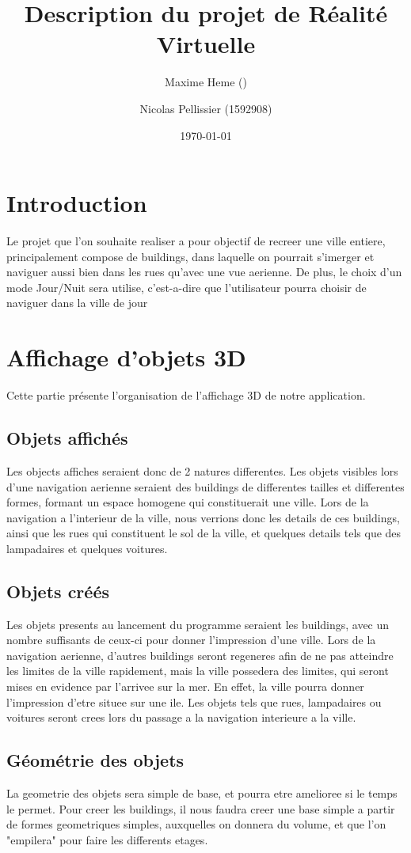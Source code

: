 \documentclass[a4paper,12pt]{article}
\title{Description du projet de Réalité Virtuelle}
\date{\today}
\author{Maxime Heme ()  \and Nicolas Pellissier (1592908)}
\begin{document}
\maketitle
\section*{Introduction}
Le projet que l'on souhaite realiser a pour objectif de recreer une ville entiere, principalement compose de buildings, dans laquelle on pourrait s'imerger et naviguer aussi bien dans les rues qu'avec une vue aerienne.
De plus, le choix d'un mode Jour/Nuit sera  utilise, c'est-a-dire que l'utilisateur pourra choisir de naviguer dans la ville de jour

\section {Affichage d'objets 3D}

Cette partie présente l'organisation de l'affichage 3D de notre application.
\subsection{Objets affichés}
Les objects affiches seraient donc de 2 natures differentes. Les objets visibles lors d'une navigation aerienne seraient des buildings de differentes tailles et differentes formes, formant un espace homogene qui constituerait une ville.
Lors de la navigation a l'interieur de la ville, nous verrions donc les details de ces buildings, ainsi que les rues qui constituent le sol de la ville, et quelques details tels que des lampadaires et quelques voitures. 

\subsection{Objets créés}
Les objets presents au lancement du programme seraient les buildings, avec un nombre suffisants de ceux-ci pour donner l'impression d'une ville. 
Lors de la navigation aerienne, d'autres buildings seront regeneres afin de ne pas atteindre les limites de la ville rapidement, mais la ville possedera des limites, qui seront mises en evidence par l'arrivee sur la mer. En effet, la ville pourra donner l'impression d'etre situee sur une ile.
Les objets tels que rues, lampadaires ou voitures seront crees lors du passage a la navigation interieure a la ville.

\subsection{Géométrie des objets}
La geometrie des objets sera simple de base, et pourra etre amelioree si le temps le permet. Pour creer les buildings, il nous faudra creer une base simple a partir de formes geometriques simples, auxquelles on donnera du volume, et que l'on "empilera" pour faire les differents etages.
\end{document}
